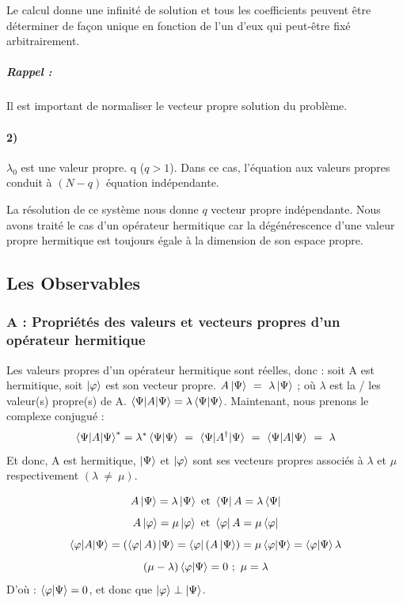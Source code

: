 \documentclass[12pt,a4paper,titlepage]{book}
\begin{document}
Le calcul donne une infinité de solution et tous les coefficients peuvent être déterminer de façon unique en fonction de l'un d'eux qui peut-être fixé arbitrairement.
\subparagraph*{Rappel :}
Il est important de normaliser le vecteur propre solution du problème.

\paragraph*{2)}
$\lambda_0$ est une valeur propre. q ($q > 1$). Dans ce cas, l'équation aux valeurs propres conduit à $(N-q)$ équation indépendante.

La résolution de ce système nous donne $q$ vecteur propre indépendante. Nous avons traité le cas d'un opérateur hermitique car la dégénérescence d'une valeur propre hermitique est toujours égale à la dimension de son espace propre.

\subsection{Les Observables}
\subsubsection{A : Propriétés des valeurs et vecteurs propres d'un opérateur hermitique}

Les valeurs propres d'un opérateur hermitique sont réelles, donc : soit A est hermitique, soit $\ket{\varphi}$ est son vecteur propre. $A \ket{\Psi} ~=~ \lambda \ket{\Psi}$ ; où $\lambda$ est la / les valeur(s) propre(s) de A. $\braket{\Psi | A | \Psi} = \lambda \braket{\Psi | \Psi}$. Maintenant, nous prenons le complexe conjugué :\\
\begin{equation*}
\braket{\Psi | A | \Psi}^{*} = \lambda^{*} \braket{\Psi | \Psi} ~=~ \braket{\Psi | A^{\dagger} | \Psi} ~=~ \braket{\Psi | A | \Psi} ~=~ \lambda
\end{equation*}
Et donc, A est hermitique, $\ket{\Psi}$ et $\ket{\varphi}$ sont ses vecteurs propres associés à $\lambda$ et $\mu$ respectivement $(\lambda ~\neq~ \mu)$.

\begin{equation*}
A \ket{\Psi} = \lambda \ket{\Psi} ~\text{et}~ \bra{\Psi} A = \lambda \bra{\Psi} 
\end{equation*}
\begin{equation*}
A \ket{\varphi} = \mu \ket{\varphi} ~\text{et}~ \bra{\varphi} A = \mu \bra{\varphi} 
\end{equation*}
\begin{equation*}
\braket{\varphi | A | \Psi} = (\bra{\varphi} A)\ket{\Psi} = \bra{\varphi} (A \ket{\Psi}) = \mu \braket{\varphi | \Psi} = \braket{\varphi | \Psi} \lambda
\end{equation*}
\begin{equation*}
(\mu - \lambda) \braket{\varphi | \Psi} = 0 ~;~ \mu = \lambda
\end{equation*}
D'où : $\braket{\varphi | \Psi} = 0$, et donc que $\ket{\varphi} \perp \ket{\Psi}$.
\end{document}
